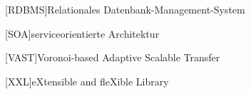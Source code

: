 \begin{acronym}[xxxxxxxxxxxx]
	

	[RDBMS]{Relationales Datenbank-Management-System}
	
	\vspace{\parsep}
	[SOA]{serviceorientierte Architektur}
	
	\vspace{\parsep}

	\vspace{\parsep}
	[VAST]{Voronoi-based Adaptive Scalable Transfer}


	\vspace{\parsep}
	[XXL]{eXtensible and fleXible Library}



\end{acronym}
